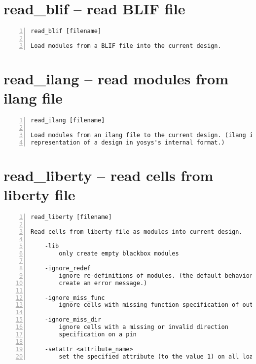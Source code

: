 \section{read\_blif -- read BLIF file}
\label{cmd:read_blif}
\begin{lstlisting}[numbers=left,frame=single]
    read_blif [filename]

Load modules from a BLIF file into the current design.
\end{lstlisting}

\section{read\_ilang -- read modules from ilang file}
\label{cmd:read_ilang}
\begin{lstlisting}[numbers=left,frame=single]
    read_ilang [filename]

Load modules from an ilang file to the current design. (ilang is a text
representation of a design in yosys's internal format.)
\end{lstlisting}

\section{read\_liberty -- read cells from liberty file}
\label{cmd:read_liberty}
\begin{lstlisting}[numbers=left,frame=single]
    read_liberty [filename]

Read cells from liberty file as modules into current design.

    -lib
        only create empty blackbox modules

    -ignore_redef
        ignore re-definitions of modules. (the default behavior is to
        create an error message.)

    -ignore_miss_func
        ignore cells with missing function specification of outputs

    -ignore_miss_dir
        ignore cells with a missing or invalid direction
        specification on a pin

    -setattr <attribute_name>
        set the specified attribute (to the value 1) on all loaded modules
\end{lstlisting}

